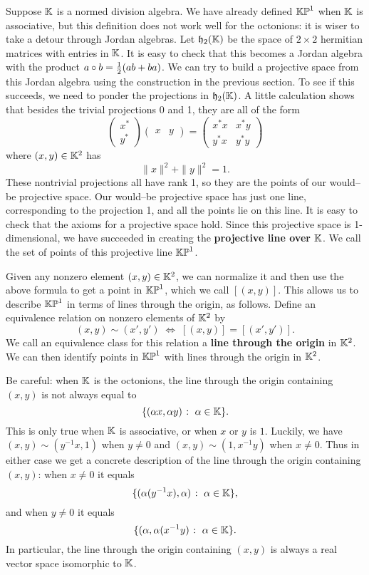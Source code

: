 Suppose ${\mathbb K}$ is a normed division algebra.  We have already defined 
${\mathbb {KP}}^1$ when ${\mathbb K}$ is associative, but this definition does not work well 
for the octonions: it is wiser to take a detour through Jordan 
algebras.  Let ${\mathfrak {h}}_2({\mathbb K})$ be the space of $2 \times 2$ hermitian 
matrices with entries in ${\mathbb K}$.  It is easy to check that this becomes a 
Jordan algebra with the product $a \circ b = {1\over 2}(ab + ba)$.  We 
can try to build a projective space from this Jordan algebra using the 
construction in the previous section.  To see if this 
succeeds, we need to ponder the projections in ${\mathfrak {h}}_2({\mathbb K})$.  A little 
calculation shows that besides the trivial projections 0 and 1, they 
are all of the form  
\[   
\left( \begin{array}{c}  x^* \\ y^* \end{array} \right)  
\left( \begin{array}{cc} \! x  &  y \! \end{array} \right)  
=  
\left( \begin{array}{cc}  
                         x^* x  & x^* y    \\  
                         y^* x  & y^* y 
\end{array} \right)  
\] 
where $(x,y) \in {\mathbb K}^2$ has 
\[         \|x\|^2 + \|y\|^2 = 1.   \] 
These nontrivial projections all have rank 1, so they are the points of 
our would--be projective space.  Our would--be projective space has just 
one line, corresponding to the projection 1, and all the points lie on 
this line.  It is easy to check that the axioms for a projective space 
hold.  Since this projective space is 1-dimensional, we have succeeded 
in creating the {\bf projective line over} ${\mathbb K}$.  We call the set of 
points of this projective line ${\mathbb {KP}}^1$. 
 
Given any nonzero element $(x,y) \in {\mathbb K}^2$, we can normalize it and then 
use the above formula to get a point in ${\mathbb {KP}}^1$, which we call 
$[(x,y)]$.   This allows us to describe ${\mathbb {KP}}^1$ in terms 
of lines through the origin, as follows.  Define an equivalence relation 
on nonzero elements of ${\mathbb K}^2$ by 
\[        (x,y) \sim (x',y') \; \iff \; [(x,y)] = [(x',y')]  .\] 
We call an equivalence class for this relation a {\bf line through the 
origin} in ${\mathbb K}^2$.  We can then identify  points in ${\mathbb {KP}}^1$ with lines 
through the origin in ${\mathbb K}^2$.  
 
Be careful: when ${\mathbb K}$ is the octonions, the line through the 
origin containing $(x,y)$ is not always equal to 
\[    \{(\alpha x, \alpha y)\; \colon \; \alpha \in {\mathbb K}\}.   \] 
This is only true when ${\mathbb K}$ is associative, or when $x$ or $y$ is 
$1$.   Luckily, we have $(x,y) \sim (y^{-1}x,1)$ when $y \ne 0$ and 
$(x,y) \sim (1,x^{-1}y)$ when $x \ne 0$.  Thus in either case we get a 
concrete description of the line through the origin containing $(x,y)$: 
when $x \ne 0$ it equals 
\[    \{(\alpha(y^{-1}x), \alpha)\; \colon \; \alpha \in {\mathbb K}\} ,  \] 
and when $y \ne 0$ it equals 
\[    \{(\alpha, \alpha(x^{-1}y)\; \colon \; \alpha \in {\mathbb K}\} .  \] 
In particular, the line through the origin containing $(x,y)$ is  
always a real vector space isomorphic to ${\mathbb K}$. 
 
